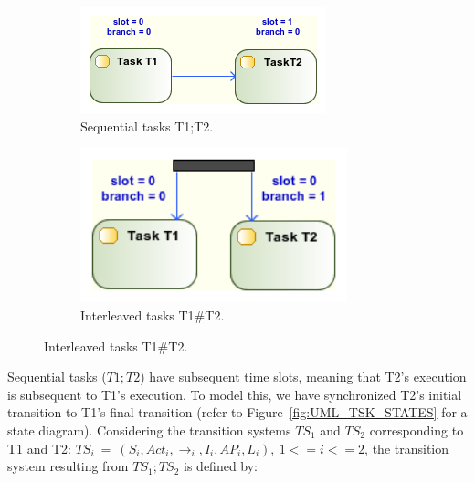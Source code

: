 \begin{figure}[ht!]
        \centering
        \begin{subfigure}[b]{0.4\textwidth}
                \includegraphics[width=\textwidth]{imgs/UML_SEQ_TSKS.png}
				\caption{Sequential tasks T1;T2.}
				\label{fig:UML_SEQ_TSKS}
        \end{subfigure}        
        \quad %
        \begin{subfigure}[b]{0.4\textwidth}                
                \includegraphics[width=0.85\textwidth]{imgs/UML_PAR_TSKS.png}
				\caption{Interleaved tasks T1\#T2.}
				\label{fig:UML_PAR_TSKS}
        \end{subfigure}%
          
\end{figure}

Sequential tasks ($T1;T2$) have subsequent time slots, meaning that T2's execution is subsequent to T1's execution. To model this, we have synchronized T2's initial transition to T1's final transition (refer to Figure~\ref{fig:UML_TSK_STATES} for a state diagram). Considering the transition systems $TS_1$ and $TS_2$ corresponding to T1 and T2: $TS_i\ =\ (S_i, Act_i, \rightarrow_i, I_i, AP_i, L_i),\ 1 <= i <= 2$, the transition system resulting from $TS_1;TS_2$ is defined by: 

